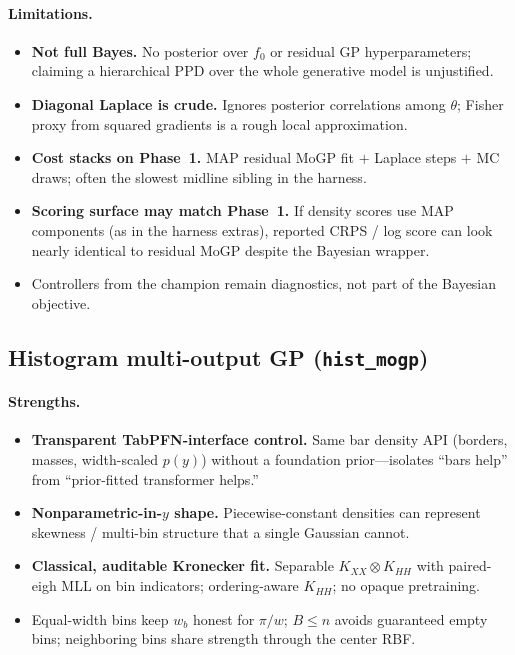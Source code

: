 \documentclass[11pt,a4paper]{article}
\theoremstyle{definition}
\begin{document}
\paragraph{Limitations.}
\begin{itemize}[leftmargin=1.2em,itemsep=2pt]
\item \textbf{Not full Bayes.} No posterior over $f_0$ or residual GP
  hyperparameters; claiming a hierarchical PPD over the whole generative model is
  unjustified.
\item \textbf{Diagonal Laplace is crude.} Ignores posterior correlations among
  $\theta$; Fisher proxy from squared gradients is a rough local approximation.
\item \textbf{Cost stacks on Phase~1.} MAP residual MoGP fit $+$ Laplace steps $+$
  MC draws; often the slowest midline sibling in the harness.
\item \textbf{Scoring surface may match Phase~1.} If density scores use MAP
  components (as in the harness extras), reported CRPS / log score can look
  nearly identical to residual MoGP despite the Bayesian wrapper.
\item Controllers from the champion remain diagnostics, not part of the Bayesian
  objective.
\end{itemize}

\subsection{Histogram multi-output GP (\texttt{hist\_mogp})}

\paragraph{Strengths.}
\begin{itemize}[leftmargin=1.2em,itemsep=2pt]
\item \textbf{Transparent TabPFN-interface control.} Same bar density API
  (borders, masses, width-scaled $p(y)$) without a foundation prior---isolates
  ``bars help'' from ``prior-fitted transformer helps.''
\item \textbf{Nonparametric-in-$y$ shape.} Piecewise-constant densities can
  represent skewness / multi-bin structure that a single Gaussian cannot.
\item \textbf{Classical, auditable Kronecker fit.} Separable
  $K_{XX}\otimes K_{HH}$ with paired-eigh MLL on bin indicators; ordering-aware
  $K_{HH}$; no opaque pretraining.
\item Equal-width bins keep $w_b$ honest for $\pi/w$; $B\le n$ avoids guaranteed
  empty bins; neighboring bins share strength through the center RBF.
\end{itemize}
\end{document}
